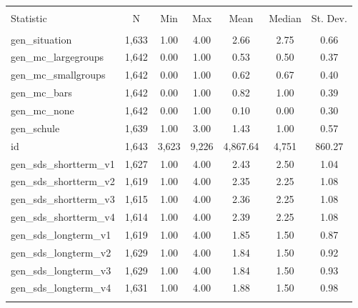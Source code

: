 
\begin{table}[!htbp] \centering 
  \caption{} 
  \label{} 
\begin{tabular}{@{\extracolsep{5pt}}lcccccc} 
\\[-1.8ex]\hline 
\hline \\[-1.8ex] 
Statistic & \multicolumn{1}{c}{N} & \multicolumn{1}{c}{Min} & \multicolumn{1}{c}{Max} & \multicolumn{1}{c}{Mean} & \multicolumn{1}{c}{Median} & \multicolumn{1}{c}{St. Dev.} \\ 
\hline \\[-1.8ex] 
gen\_situation & 1,633 & 1.00 & 4.00 & 2.66 & 2.75 & 0.66 \\ 
gen\_mc\_largegroups & 1,642 & 0.00 & 1.00 & 0.53 & 0.50 & 0.37 \\ 
gen\_mc\_smallgroups & 1,642 & 0.00 & 1.00 & 0.62 & 0.67 & 0.40 \\ 
gen\_mc\_bars & 1,642 & 0.00 & 1.00 & 0.82 & 1.00 & 0.39 \\ 
gen\_mc\_none & 1,642 & 0.00 & 1.00 & 0.10 & 0.00 & 0.30 \\ 
gen\_schule & 1,639 & 1.00 & 3.00 & 1.43 & 1.00 & 0.57 \\ 
id & 1,643 & 3,623 & 9,226 & 4,867.64 & 4,751 & 860.27 \\ 
gen\_sds\_shortterm\_v1 & 1,627 & 1.00 & 4.00 & 2.43 & 2.50 & 1.04 \\ 
gen\_sds\_shortterm\_v2 & 1,619 & 1.00 & 4.00 & 2.35 & 2.25 & 1.08 \\ 
gen\_sds\_shortterm\_v3 & 1,615 & 1.00 & 4.00 & 2.36 & 2.25 & 1.08 \\ 
gen\_sds\_shortterm\_v4 & 1,614 & 1.00 & 4.00 & 2.39 & 2.25 & 1.08 \\ 
gen\_sds\_longterm\_v1 & 1,619 & 1.00 & 4.00 & 1.85 & 1.50 & 0.87 \\ 
gen\_sds\_longterm\_v2 & 1,629 & 1.00 & 4.00 & 1.84 & 1.50 & 0.92 \\ 
gen\_sds\_longterm\_v3 & 1,629 & 1.00 & 4.00 & 1.84 & 1.50 & 0.93 \\ 
gen\_sds\_longterm\_v4 & 1,631 & 1.00 & 4.00 & 1.88 & 1.50 & 0.98 \\ 
\hline \\[-1.8ex] 
\end{tabular} 
\end{table} 

